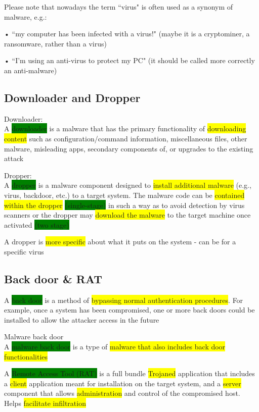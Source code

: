 \documentclass[]{project_plan}
\begin{document}
Please note that nowadays the term
“virus" is often used as a synonym of
malware, e.g.:

• “my computer has been infected with a
virus!" (maybe it is a cryptominer, a
ransomware, rather than a virus)

• “I’m using an anti-virus to protect my
PC" (it should be called more correctly
an anti-malware)

\subsection{Downloader and Dropper}

Downloader:\\
A \colorbox{green}{downloader} is a malware that has the primary functionality of \colorbox{yellow}{downloading content}
such as configuration/command information, miscellaneous files, other malware,
misleading apps, secondary components of, or upgrades to the existing attack

Dropper:\\
A \colorbox{green}{dropper} is a malware component designed to \colorbox{yellow}{install additional malware} (e.g., virus,
backdoor, etc.) to a target system. The malware code can be \colorbox{yellow}{contained within the dropper}
\colorbox{green}{(single-stage)} in such a way as to avoid detection by virus scanners or the dropper may
\colorbox{yellow}{download the malware} to the target machine once activated \colorbox{green}{(two stage)}

A dropper is \colorbox{yellow}{more specific} about what it puts on the system - can be for a specific virus

\subsection{Back door \& RAT}

A \colorbox{green}{back door} is a method of \colorbox{yellow}{bypassing normal authentication procedures}. For example, once
a system has been compromised, one or more back doors could be installed to allow the
attacker access in the future

Malware back door\\
A \colorbox{green}{malware back door} is a type of \colorbox{yellow}{malware that also includes back door functionalities}

A \colorbox{green}{Remote Access Tool (RAT)} is a full bundle \colorbox{yellow}{Trojaned} application that includes a \colorbox{yellow}{client} application
meant for installation on the target system, and a \colorbox{yellow}{server} component that allows \colorbox{yellow}{administration} and
control of the compromised host. Helps \colorbox{yellow}{facilitate infiltration}
\end{document}
